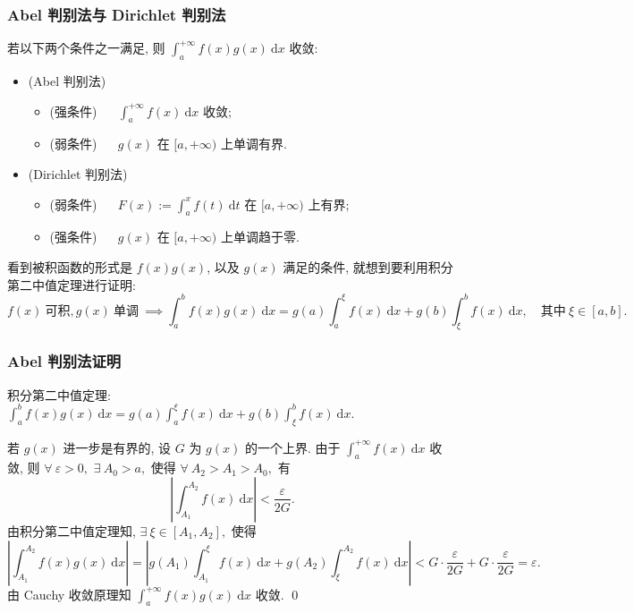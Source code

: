 \begin{frame}
\frametitle{Abel 判别法与 Dirichlet 判别法}

\begin{thm}
若以下两个条件之一满足, 则 $\displaystyle \int_a^{+\infty} f(x)g(x) ~ \mathrm{d} x$ 收敛:
\begin{itemize}
\item (Abel 判别法)
\begin{itemize}
\item (强条件) ~~ $\displaystyle \int_a^{+\infty} f(x) ~ \mathrm{d} x$ 收敛;
\item (弱条件) ~~ $g(x)$ 在 $[a, +\infty)$ 上单调有界.
\end{itemize}
\pause
\vspace{0.5em}
\item (Dirichlet 判别法)
\begin{itemize}
\item (弱条件) ~~ $F(x) := \int_a^x f(t) ~ \mathrm{d} t$ 在 $[a, +\infty)$ 上有界;
\item (强条件) ~~ $g(x)$ 在 $[a, +\infty)$ 上单调趋于零.
\end{itemize}
\end{itemize}
\end{thm}

\pause

看到被积函数的形式是 $f(x)g(x)$, 以及 $g(x)$ 满足的条件, 就想到要利用积分第二中值定理进行证明:
\[
f(x) ~ \text{可积}, g(x) ~ \text{单调} ~ \implies \int_a^b f(x)g(x) ~ \mathrm{d} x = g(a) \int_a^{\xi} f(x) ~ \mathrm{d} x + g(b) \int_{\xi}^b f(x) ~ \mathrm{d} x, \quad \text{其中}~\xi \in [a, b].
\]

\end{frame}


\begin{frame}
\frametitle{Abel 判别法证明}

积分第二中值定理: $\int_a^b f(x)g(x) ~ \mathrm{d} x = g(a) \int_a^{\xi} f(x) ~ \mathrm{d} x + g(b) \int_{\xi}^b f(x) ~ \mathrm{d} x$.

\vspace{1em}

若 $g(x)$ 进一步是有界的, 设 $G$ 为 $g(x)$ 的一个上界. 由于 $\displaystyle \int_a^{+\infty} f(x) ~ \mathrm{d} x$ 收敛, 则 $\forall ~ \varepsilon > 0,$ $\exists ~ A_0 > a,$ 使得 $\forall ~ A_2 > A_1 > A_0,$ 有
\[
\left| \int_{A_1}^{A_2} f(x) ~ \mathrm{d} x \right| < \frac{\varepsilon}{2G}.
\]
由积分第二中值定理知, $\exists ~ \xi \in [A_1, A_2],$ 使得
\[
\left| \int_{A_1}^{A_2} f(x)g(x) ~ \mathrm{d} x \right| = \left| g(A_1) \int_{A_1}^{\xi} f(x) ~ \mathrm{d} x + g(A_2) \int_{\xi}^{A_2} f(x) ~ \mathrm{d} x \right| < G \cdot \frac{\varepsilon}{2G} + G \cdot \frac{\varepsilon}{2G} = \varepsilon.
\]
由 Cauchy 收敛原理知 $\displaystyle \int_a^{+\infty} f(x)g(x) ~ \mathrm{d} x$ 收敛.
\qed

\end{frame}

